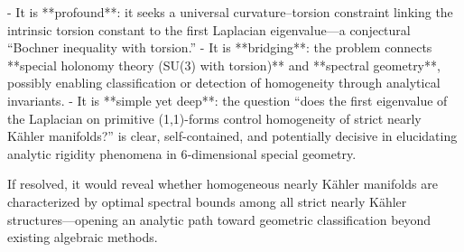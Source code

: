 - It is **profound**: it seeks a universal curvature–torsion constraint linking the intrinsic torsion constant to the first Laplacian eigenvalue—a conjectural “Bochner inequality with torsion.”  
- It is **bridging**: the problem connects **special holonomy theory (SU(3) with torsion)** and **spectral geometry**, possibly enabling classification or detection of homogeneity through analytical invariants.  
- It is **simple yet deep**: the question “does the first eigenvalue of the Laplacian on primitive (1,1)-forms control homogeneity of strict nearly Kähler manifolds?” is clear, self-contained, and potentially decisive in elucidating analytic rigidity phenomena in 6‑dimensional special geometry.  

If resolved, it would reveal whether homogeneous nearly Kähler manifolds are characterized by optimal spectral bounds among all strict nearly Kähler structures—opening an analytic path toward geometric classification beyond existing algebraic methods.